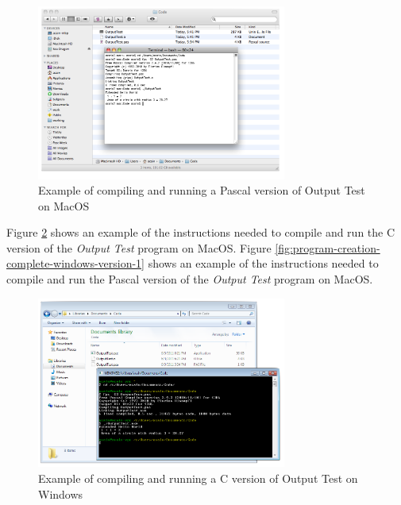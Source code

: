 \begin{figure}[h]
   \centering
   \includegraphics[width=0.73\textwidth]{./topics/program-creation/images/MacOSCompleteExample} 
   \caption{Example of compiling and running a Pascal version of Output Test on MacOS}
   \label{fig:program-creation-complete-macos-version-1}
\end{figure}

\clearpage
Figure \ref{fig:program-creation-complete-windows-version} shows an example of the instructions needed to compile and run the C version of the \emph{Output Test} program on MacOS. Figure \ref{fig:program-creation-complete-windows-version-1} shows an example of the instructions needed to compile and run the Pascal version of the \emph{Output Test} program on MacOS.

\begin{figure}[h]
   \centering
   \includegraphics[width=0.73\textwidth]{./topics/program-creation/images/WindowsCompleteExample} 
   \caption{Example of compiling and running a C version of Output Test on Windows}
   \label{fig:program-creation-complete-windows-version}
\end{figure}

